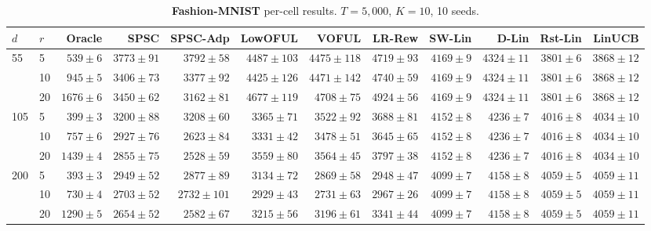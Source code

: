 \begin{table}[!htbp]
\centering
\caption{\textbf{Fashion-MNIST} per-cell results. $T{=}5{,}000$, $K{=}10$, 10 seeds.}
\label{tab:app-fmnist}
\scriptsize
\setlength{\tabcolsep}{3pt}
\begin{tabular}{llrrrrrrrrrr}
\toprule
$d$ & $r$ & Oracle & \textbf{SPSC} & \textbf{SPSC-Adp} & LowOFUL & VOFUL & LR-Rew & SW-Lin & D-Lin & Rst-Lin & LinUCB \\
\midrule
55 & 5 & $539{\pm}6$ & \cellcolor{green!12}$3773{\pm}91$ & \cellcolor{green!12}$3792{\pm}58$ & $4487{\pm}103$ & $4475{\pm}118$ & $4719{\pm}93$ & $4169{\pm}9$ & $4324{\pm}11$ & \underline{$3801{\pm}6$} & $3868{\pm}12$ \\
 & 10 & $945{\pm}5$ & \cellcolor{green!12}$3406{\pm}73$ & \cellcolor{green!12}$3377{\pm}92$ & $4425{\pm}126$ & $4471{\pm}142$ & $4740{\pm}59$ & $4169{\pm}9$ & $4324{\pm}11$ & \underline{$3801{\pm}6$} & $3868{\pm}12$ \\
 & 20 & $1676{\pm}6$ & \cellcolor{green!12}$3450{\pm}62$ & \cellcolor{green!12}$3162{\pm}81$ & $4677{\pm}119$ & $4708{\pm}75$ & $4924{\pm}56$ & $4169{\pm}9$ & $4324{\pm}11$ & \underline{$3801{\pm}6$} & $3868{\pm}12$ \\
105 & 5 & $399{\pm}3$ & \cellcolor{green!12}$3200{\pm}88$ & \cellcolor{green!12}$3208{\pm}60$ & \underline{$3365{\pm}71$} & $3522{\pm}92$ & $3688{\pm}81$ & $4152{\pm}8$ & $4236{\pm}7$ & $4016{\pm}8$ & $4034{\pm}10$ \\
 & 10 & $757{\pm}6$ & \cellcolor{green!12}$2927{\pm}76$ & \cellcolor{green!12}$2623{\pm}84$ & \underline{$3331{\pm}42$} & $3478{\pm}51$ & $3645{\pm}65$ & $4152{\pm}8$ & $4236{\pm}7$ & $4016{\pm}8$ & $4034{\pm}10$ \\
 & 20 & $1439{\pm}4$ & \cellcolor{green!12}$2855{\pm}75$ & \cellcolor{green!12}$2528{\pm}59$ & \underline{$3559{\pm}80$} & $3564{\pm}45$ & $3797{\pm}38$ & $4152{\pm}8$ & $4236{\pm}7$ & $4016{\pm}8$ & $4034{\pm}10$ \\
200 & 5 & $393{\pm}3$ & $2949{\pm}52$ & $2877{\pm}89$ & $3134{\pm}72$ & \underline{$2869{\pm}58$} & $2948{\pm}47$ & $4099{\pm}7$ & $4158{\pm}8$ & $4059{\pm}5$ & $4059{\pm}11$ \\
 & 10 & $730{\pm}4$ & \cellcolor{green!12}$2703{\pm}52$ & $2732{\pm}101$ & $2929{\pm}43$ & \underline{$2731{\pm}63$} & $2967{\pm}26$ & $4099{\pm}7$ & $4158{\pm}8$ & $4059{\pm}5$ & $4059{\pm}11$ \\
 & 20 & $1290{\pm}5$ & \cellcolor{green!12}$2654{\pm}52$ & \cellcolor{green!12}$2582{\pm}67$ & $3215{\pm}56$ & \underline{$3196{\pm}61$} & $3341{\pm}44$ & $4099{\pm}7$ & $4158{\pm}8$ & $4059{\pm}5$ & $4059{\pm}11$ \\
\bottomrule
\end{tabular}
\end{table}

